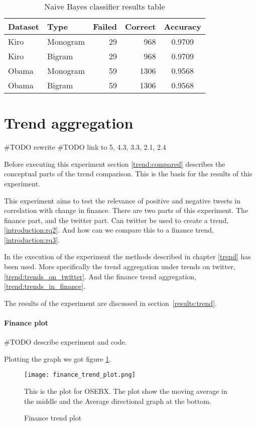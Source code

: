 \begin{table}
\centering
\label{tbl:naive_bayes_classification_results}
\caption{Naive Bayes classifier results table}
\begin{tabular}{ l l r r c }
Dataset & Type & Failed & Correct & Accuracy \\ 
\hline 
Kiro & Monogram & 29 & 968 & 0.9709 \\
Kiro & Bigram & 29 & 968 & 0.9709 \\
Obama & Monogram & 59 & 1306 & 0.9568 \\
Obama & Bigram & 59 & 1306 & 0.9568 \\
\end{tabular}
\end{table}
%

\section{Trend aggregation}\label{experiments:trend}

#TODO rewrite
#TODO link to 5, 4.3, 3.3, 2.1, 2.4 

Before executing this experiment section \ref{trend:compared} describes the
conceptual parts of the trend comparison. This is the basis for the results of
this experiment. 

This experiment aims to test the relevance of positive and negative tweets in
correlation with change in finance. There are two parts of this experiment. The
finance part, and the twitter part. Can twitter be used to create a trend,
\ref{introduction:rq2}. And how can we compare this to a finance trend,
\ref{introduction:rq3}.

In the execution of the experiment the methods described in chapter \ref{trend}
has been used. More specifically the trend aggregation under trends on twitter,
\ref{trend:trends_on_twitter}. And the finance trend aggregation,
\ref{trend:trends_in_finance}.

The results of the experiment are discussed in section \ref{results:trend}.

\paragraph{Finance plot}
#TODO describe experiment and code. 

Plotting the graph we got figure \ref{fig:trend_finance_plot}.
\begin{figure}[htb]
    \centering
    \texttt{[image: finance\_trend\_plot.png]}
    \label{fig:trend_finance_plot}
    \caption{Finance trend plot}
This is the plot for OSEBX. The plot show the moving average in the middle and
the Average directional graph at the bottom.
\end{figure}


